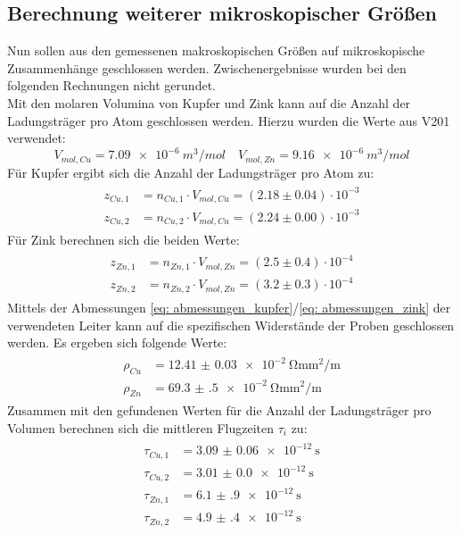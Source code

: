 \subsection{Berechnung weiterer mikroskopischer Größen}
Nun sollen aus den gemessenen makroskopischen Größen auf mikroskopische Zusammenhänge geschlossen werden. Zwischenergebnisse
wurden bei den folgenden Rechnungen nicht gerundet. \\
Mit den molaren Volumina von Kupfer und Zink kann auf die Anzahl der Ladungsträger pro Atom
geschlossen werden. Hierzu wurden die Werte aus V201 \cite{anleitung201} verwendet:
\begin{equation}
  V_{mol, Cu} = \SI{7.09e-6}{m^3 /mol} \quad   V_{mol, Zn} = \SI{9.16e-6}{m^3 /mol}%
\end{equation}
Für Kupfer ergibt sich die Anzahl der Ladungsträger pro Atom zu:
\begin{align}
  \begin{aligned}
    z_{Cu,1} &= n_{Cu,1} \cdot V_{mol, Cu} =  (2.18 \pm 0.04) \cdot 10^{-3}  \\
    z_{Cu,2} &= n_{Cu,2} \cdot V_{mol, Cu} =  (2.24 \pm 0.00) \cdot 10^{-3}
  \end{aligned}
\end{align}
Für Zink berechnen sich die beiden Werte:
\begin{align}
  \begin{aligned}
    z_{Zn,1} &= n_{Zn,1} \cdot V_{mol, Zn} =  (2.5\pm 0.4)\cdot 10^{-4}\\
    z_{Zn,2} &= n_{Zn,2} \cdot V_{mol, Zn} =   (3.2\pm 0.3)\cdot 10^{-4}
  \end{aligned}
\end{align}
Mittels der Abmessungen \eqref{eq: abmessungen_kupfer}/\eqref{eq: abmessungen_zink} der verwendeten Leiter kann auf die spezifischen Widerstände der Proben geschlossen werden. Es ergeben sich folgende Werte:
\begin{align}
  \begin{aligned}
    \rho_{Cu} &=  \SI{12.41(3)e-2}{\ohm \milli \meter^2 \per \meter} \\%
    \rho_{Zn} &=  \SI{69.3(5)e-2}{\ohm \milli \meter^2 \per \meter}
    \label{eq: res_spez_widerstand}
  \end{aligned}
\end{align}
Zusammen mit den gefundenen Werten für die Anzahl der Ladungsträger pro Volumen berechnen sich die mittleren Flugzeiten $\tau_i$ zu:
\begin{align}
  \begin{aligned}
    \tau_{Cu,1} &= \SI{3.09(6)e-12}{\second} \\%
    \tau_{Cu,2} &= \SI{3.01(0)e-12}{\second} \\
    \tau_{Zn,1} &= \SI{6.1(9)e-12}{\second} \\
    \tau_{Zn,2} &= \SI{4.9(4)e-12}{\second}
  \end{aligned}
\end{align}
